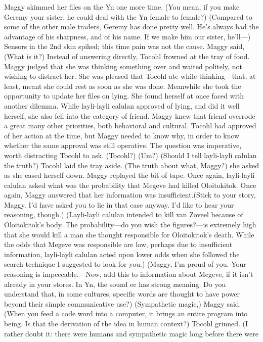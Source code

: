 \documentclass[9pt]{article}
\begin{document}
Maggy skimmed her files on the Yn one more time. (You mean, if you make Geremy your sister, he
could deal with the Yn female to female?)
(Compared to some of the other male traders, Geremy has done pretty well. He’s always had the
advantage of his sharpness, and of his name. If we make him our sister, he’ll—)
Sensors in the 2nd skin spiked; this time pain was not the cause. Maggy said, (What is it?)
Instead of answering directly, Tocohl frowned at the tray of food. Maggy judged that she was
thinking something over and waited politely, not wishing to distract her. She was pleased that Tocohl ate
while thinking—that, at least, meant she could rest as soon as she was done. Meanwhile she took the
opportunity to update her files on lying.
She found herself at once faced with another dilemma. While layli-layli calulan approved of lying,
and did it well herself, she also fell into the category of friend. Maggy knew that friend overrode a great
many other priorities, both behavioral and cultural. Tocohl had approved of her action at the time, but
Maggy needed to know why, in order to know whether the same approval was still operative. The
question was imperative, worth distracting Tocohl to ask. (Tocohl?)
(Um?)
(Should I tell layli-layli calulan the truth?)
Tocohl laid the tray aside. (The truth about what, Maggy?) she asked as she eased herself down.
Maggy replayed the bit of tape. Once again, layli-layli calulan asked what was the probability that
Megeve had killed Oloitokitok. Once again, Maggy answered that her information was insufficient.(Stick to your story, Maggy. I’d have asked you to lie in that case anyway. I’d like to hear your
reasoning, though.)
(Layli-layli calulan intended to kill van Zoveel because of Oloitokitok’s body. The probability—do
you wish the figures?—is extremely high that she would kill a man she thought responsible for
Oloitokitok’s death. While the odds that Megeve was responsible are low, perhaps due to insufficient
information, layli-layli calulan acted upon lower odds when she followed the search technique I
suggested to look for you.)
(Maggy, I’m proud of you. Your reasoning is impeccable.—Now, add this to information about
Megeve, if it isn’t already in your stores. In Yn, the sound ee has strong meaning. Do you understand
that, in some cultures, specific words are thought to have power beyond their simple communicative
use?)
(Sympathetic magic,) Maggy said. (When you feed a code word into a computer, it brings an entire
program into being. Is that the derivation of the idea in human context?)
Tocohl grinned. (I rather doubt it: there were humans and sympathetic magic long before there were
\end{document}
